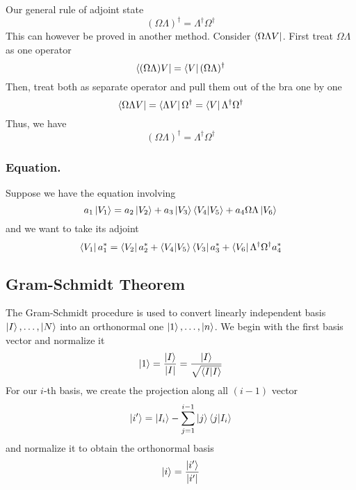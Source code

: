 \documentclass[../main.tex]{subfiles}
\begin{document}
Our general rule of adjoint state
\begin{equation*}
	(\Omega\Lambda)^\dagger=\Lambda ^\dagger \Omega ^\dagger
\end{equation*}
This can however be proved in another method.
Consider $\bra{\Omega \Lambda V}$. First treat $\Omega\Lambda$ as one operator
\begin{equation*}
	\bra{(\Omega\Lambda)V}=\bra{V}(\Omega\Lambda) ^\dagger
\end{equation*}
Then, treat both as separate operator and pull them out of the bra one by one
\begin{equation*}
	\bra{\Omega\Lambda V}=\bra{\Lambda V}\Omega^\dagger=\bra{V}\Lambda ^\dagger \Omega ^\dagger
\end{equation*}
Thus, we have
\begin{equation*}
	(\Omega\Lambda) ^\dagger=\Lambda ^\dagger\Omega ^\dagger
\end{equation*}

\subsubsection*{Equation.}
Suppose we have the equation involving
\begin{equation*}
	a_1 \ket{V_1}=a_2 \ket{V_2}+a_3 \ket{V_3}\braket{V_4|V_5}+a_4\Omega\Lambda \ket{V_6}
\end{equation*}
and we want to take its adjoint
\begin{equation*}
	\bra{V_1}a_1 ^*=\bra{V_2}a_2 ^*+\braket{V_4|V_5}\bra{V_3}a_3 ^*+\bra{V_6}\Lambda ^\dagger\Omega ^\dagger a_4 ^*
\end{equation*}

\subsection*{Gram-Schmidt Theorem}
The Gram-Schmidt procedure is used to convert linearly independent basis $\ket{I},\dots,\ket{N}$ into an orthonormal one $\ket{1},\dots,\ket{n}$.
We begin with the first basis vector and normalize it
\begin{equation*}
	\ket{1}=\frac{\ket{I}}{|I|}=\frac{\ket{I}}{\sqrt{\braket{I|I}}}
\end{equation*}
For our $i$-th basis, we create the projection along all $(i-1)$ vector
\begin{equation*}
	\ket{i'}=\ket{I_i}-\sum_{j=1}^{i-1}\ket{j}\braket{j|I_i}
\end{equation*}
and normalize it to obtain the orthonormal basis
\begin{equation*}
	\ket{i}=\frac{\ket{i'}}{|i'|}
\end{equation*}
\end{document}
